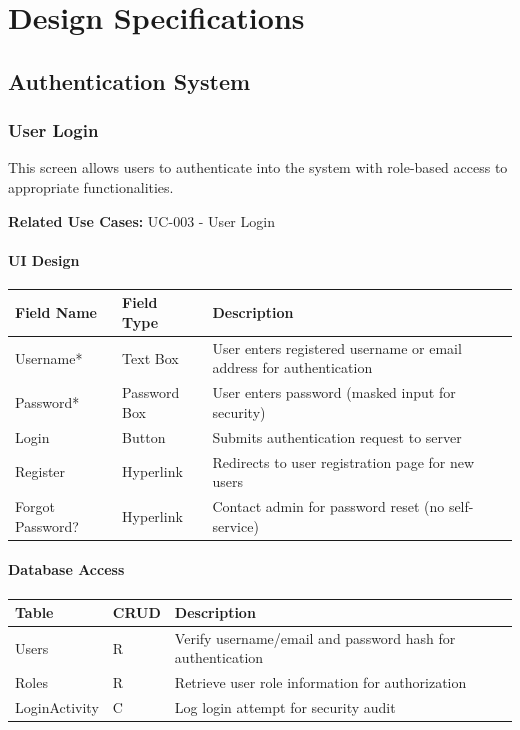 \documentclass[12pt,a4paper]{article}
\begin{document}
\section{Design Specifications}

\subsection{Authentication System}

\subsubsection{User Login}

This screen allows users to authenticate into the system with role-based access to appropriate functionalities.

\textbf{Related Use Cases:} UC-003 - User Login

\paragraph{UI Design}

\begin{longtable}{|p{3cm}|p{3cm}|p{8cm}|}
\hline
\textbf{Field Name} & \textbf{Field Type} & \textbf{Description} \\
\hline
Username* & Text Box & User enters registered username or email address for authentication \\
\hline
Password* & Password Box & User enters password (masked input for security) \\
\hline
Login & Button & Submits authentication request to server \\
\hline
Register & Hyperlink & Redirects to user registration page for new users \\
\hline
Forgot Password? & Hyperlink & Contact admin for password reset (no self-service) \\
\hline
\end{longtable}

\paragraph{Database Access}

\begin{longtable}{|p{3cm}|p{2cm}|p{9cm}|}
\hline
\textbf{Table} & \textbf{CRUD} & \textbf{Description} \\
\hline
Users & R & Verify username/email and password hash for authentication \\
\hline
Roles & R & Retrieve user role information for authorization \\
\hline
LoginActivity & C & Log login attempt for security audit \\
\hline
\end{longtable}
\end{document}
